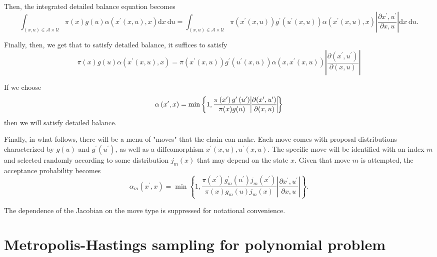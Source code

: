 \documentclass[11pt]{article}
\begin{document}
Then, the integrated detailed balance equation becomes
\begin{equation}
\int_{(x, u) \in \mathcal{A} \times \mathcal{U}} \pi(x) g(u) \alpha\left(x^{\prime}(x, u), x\right) \mathrm{d} x \mathrm{~d} u=\int_{(x, u) \in \mathcal{A} \times \mathcal{U}} \pi\left(x^{\prime}(x, u)\right) g^{\prime}\left(u^{\prime}(x, u)\right) \alpha\left(x^{\prime}(x, u), x\right)\left|\frac{\partial x^{\prime}, u^{\prime}}{\partial x, u}\right| \mathrm{d} x \mathrm{~d} u .
\end{equation}

Finally, then, we get that to satisfy detailed balance, it suffices to satisfy
\begin{equation}
\pi(x) g(u) \alpha\left(x^{\prime}(x, u), x\right)=\pi\left(x^{\prime}(x, u)\right) g^{\prime}\left(u^{\prime}(x, u)\right) \alpha\left(x, x^{\prime}(x, u)\right)\left|\frac{\partial (x^{\prime}, u^{\prime})}{\partial (x, u)}\right|
\end{equation}

If we choose
\begin{equation}
\alpha\left(x^{\prime}, x\right)=\min \left\{1, \frac{\pi\left(x^{\prime}\right) g^{\prime}\left(u^{\prime}\right)}{\pi(x) g(u)} \vline \frac{\partial (x^{\prime}, u^{\prime})}{\partial (x, u)} \vline \right\}
\end{equation}
then we will satisfy detailed balance.

Finally, in what follows, there will be a menu of "moves" that the chain can make. Each move comes with proposal distributions characterized by $g(u)$ and $g^{\prime}\left(u^{\prime}\right)$, as well as a diffeomorphism $x^{\prime}(x, u), u^{\prime}(x, u)$. The specific move will be identified with an index $m$ and selected randomly according to some distribution $j_{m}(x)$ that may depend on the state $x$. Given that move $m$ is attempted, the acceptance probability becomes
\begin{equation}
\boxed{\alpha_{m}\left(x^{\prime}, x\right)=\min \left\{1, \frac{\pi\left(x^{\prime}\right) g_{m}^{\prime}\left(u^{\prime}\right) j_{m}\left(x^{\prime}\right)}{\pi(x) g_{m}(u) j_{m}(x)}\left|\frac{\partial x^{\prime}, u^{\prime}}{\partial x, u}\right|\right\}} .
\end{equation}

The dependence of the Jacobian on the move type is suppressed for notational convenience.

\section{Metropolis-Hastings sampling for polynomial problem}
\end{document}
